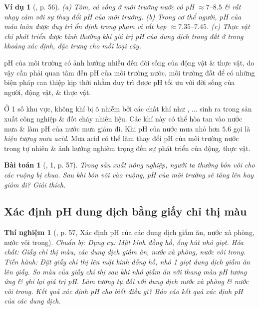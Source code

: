 \documentclass{article}
\newtheorem{baitoan}{Bài toán}
\newtheorem{thinghiem}{Thí nghiệm}
\newtheorem{vidu}{Ví dụ}
\begin{document}
\begin{vidu}[\cite{SGK_KHTN_8_Canh_Dieu}, p. 56]
	(a) Tôm, cá sống ở môi trường nước có pH $\approx7$--$8.5$ \& rất nhạy cảm với sự thay đổi pH của môi trường. (b) Trong cơ thể người, pH của máu luôn được duy trì ổn định trong phạm vi rất hẹp $\approx7.35$--$7.45$. (c) Thực vật chỉ phát triển được bình thường khi giá trị pH của dung dịch trong đất ở trong khoảng xác định, đặc trưng cho mỗi loại cây.
\end{vidu}
pH của môi trường có ảnh hưởng nhiều đến đời sống của động vật \& thực vật, do vậy cần phải quan tâm đến pH của môi trường nước, môi trường đất để có những biện pháp can thiệp kịp thời nhằm duy trì được pH tối ưu với đời sống của người, động vật, \& thực vật.

Ở 1 số khu vực, không khí bị ô nhiễm bởi các chất khí như , $\ldots$ sinh ra trong sản xuất công nghiệp \& đốt cháy nhiên liệu. Các khí này có thể hòa tan vào nước mưa \& làm pH của nước mưa giảm đi. Khi pH của nước mưa nhỏ hơn $5.6$ gọi là \textit{hiện tượng mưa acid}. Mưa acid có thể làm thay đổi pH của môi trường nước trong tự nhiên \& ảnh hưởng nghiêm trọng đến sự phát triển của động, thực vật.

\begin{baitoan}[\cite{SGK_KHTN_8_Canh_Dieu}, 1, p. 57]
	Trong sản xuất nông nghiệp, người ta thường bón vôi cho các ruộng bị chua. Sau khi bón vôi vào ruộng, pH của môi trường sẽ tăng lên hay giảm đi? Giải thích.
\end{baitoan}

\subsection{Xác định pH dung dịch bằng giấy chỉ thị màu}

\begin{thinghiem}[\cite{SGK_KHTN_8_Canh_Dieu}, p. 57, Xác định pH của các dung dịch giấm ăn, nước xà phòng, nước vôi trong]
	\emph{Chuẩn bị:} Dụng cụ: Mặt kính đồng hồ, ống hút nhỏ giọt. Hóa chất: Giấy chỉ thị màu, các dung dịch giấm ăn, nước xà phòng, nước vôi trong. \emph{Tiến hành:} Đặt giấy chỉ thị lên mặt kính đồng hồ, nhỏ 1 giọt dung dịch giấm ăn lên giấy. So màu của giấy chỉ thị sau khi nhỏ giấm ăn với thang màu pH tương ứng \& ghi lại giá trị pH. Làm tương tự đối với dung dịch nước xà phòng \& nước vôi trong. Kết quả xác định pH cho biết điều gì? Báo cáo kết quả xác định pH của các dung dịch.
\end{thinghiem}
\end{document}
